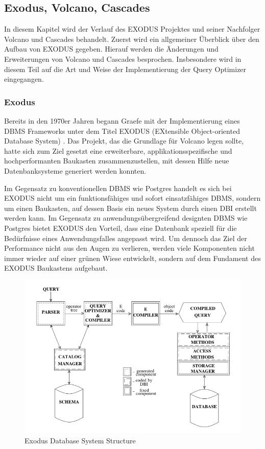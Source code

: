 \subsection{Exodus, Volcano, Cascades}

In diesem Kapitel wird der Verlauf des EXODUS Projektes und seiner Nachfolger Volcano und Cascades behandelt. Zuerst wird ein allgemeiner Überblick über den Aufbau von EXODUS gegeben. Hierauf werden die Änderungen und Erweiterungen von Volcano und Cascades besprochen. Insbesondere wird in diesem Teil auf die Art und Weise der Implementierung der Query Optimizer eingegangen. 

\subsubsection{Exodus}


Bereits in den 1970er Jahren begann Graefe mit der Implementierung eines DBMS Frameworks unter dem Titel EXODUS (EXtensible Object-oriented Database System) \cite{carey1990exodus} . Das Projekt, das die Grundlage für Volcano legen sollte, hatte sich zum Ziel gesetzt eine erweiterbare, applikationsspezifische und hochperformanten Baukasten zusammenzustellen, mit dessen Hilfe neue Datenbanksysteme generiert werden konnten. 

Im Gegensatz zu konventionellen DBMS wie Postgres handelt es sich bei EXODUS nicht um ein funktionsfähiges und sofort einsatzfähiges DBMS, sondern um einen Baukasten, auf dessen Basis ein neues System durch einen DBI erstellt werden kann. Im Gegensatz zu anwendungsübergreifend designten DBMS wie Postgres bietet EXODUS den Vorteil, dass eine Datenbank speziell für die Bedürfnisse eines Anwendungsfalles angepasst wird. Um dennoch das Ziel der Performance nicht aus den Augen zu verlieren, werden viele Komponenten nicht immer wieder auf einer grünen Wiese entwickelt, sondern auf dem Fundament des EXODUS Baukastens aufgebaut.

\begin{figure}[h]
  \centering
  \includegraphics[width=\textwidth]{02_Grundlagen/ExodusDatabaseSystemStructure.png}
  \caption{Exodus Database System Structure}
\end{figure}

